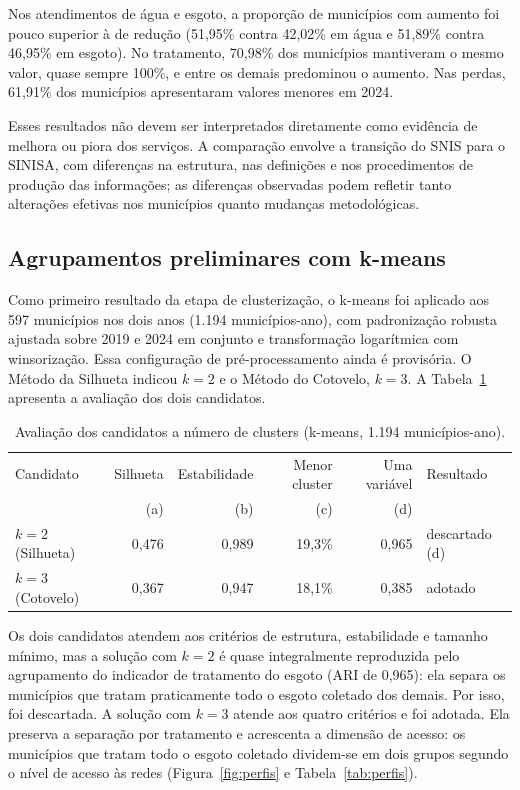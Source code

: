 \documentclass[12pt]{article}
\begin{document}
Nos atendimentos de água e esgoto, a proporção de municípios com aumento foi pouco superior à de
redução (51,95\% contra 42,02\% em água e 51,89\% contra 46,95\% em esgoto). No tratamento, 70,98\%
dos municípios mantiveram o mesmo valor, quase sempre 100\%, e entre os demais predominou o aumento.
Nas perdas, 61,91\% dos municípios apresentaram valores menores em 2024.

Esses resultados não devem ser interpretados diretamente como evidência de melhora ou piora dos
serviços. A comparação envolve a transição do SNIS para o SINISA, com diferenças na estrutura, nas
definições e nos procedimentos de produção das informações; as diferenças observadas podem refletir
tanto alterações efetivas nos municípios quanto mudanças metodológicas.

\subsection{Agrupamentos preliminares com k-means}
\label{sec:agrupamentos}

Como primeiro resultado da etapa de clusterização, o k-means foi aplicado aos 597 municípios nos dois
anos (1.194 municípios-ano), com padronização robusta ajustada sobre 2019 e 2024 em conjunto e
transformação logarítmica com winsorização. Essa configuração de pré-processamento ainda é
provisória. O Método da Silhueta indicou $k = 2$ e o Método do Cotovelo, $k = 3$. A
Tabela~\ref{tab:candidatos} apresenta a avaliação dos dois candidatos.

\begin{table}[ht]
\centering
\caption{Avaliação dos candidatos a número de clusters (k-means, 1.194 municípios-ano).}
\label{tab:candidatos}
\small
\begin{tabular}{lrrrrl}
\toprule
Candidato & Silhueta & Estabilidade & Menor cluster & Uma variável & Resultado \\
 & (a) & (b) & (c) & (d) & \\
\midrule
$k = 2$ (Silhueta) & 0,476 & 0,989 & 19,3\% & 0,965 & descartado (d) \\
$k = 3$ (Cotovelo) & 0,367 & 0,947 & 18,1\% & 0,385 & adotado \\
\bottomrule
\end{tabular}
\end{table}

Os dois candidatos atendem aos critérios de estrutura, estabilidade e tamanho mínimo, mas a solução
com $k = 2$ é quase integralmente reproduzida pelo agrupamento do indicador de tratamento do esgoto
(ARI de 0,965): ela separa os municípios que tratam praticamente todo o esgoto coletado dos demais.
Por isso, foi descartada. A solução com $k = 3$ atende aos quatro critérios e foi adotada. Ela
preserva a separação por tratamento e acrescenta a dimensão de acesso: os municípios que tratam todo
o esgoto coletado dividem-se em dois grupos segundo o nível de acesso às redes
(Figura~\ref{fig:perfis} e Tabela~\ref{tab:perfis}).
\end{document}
